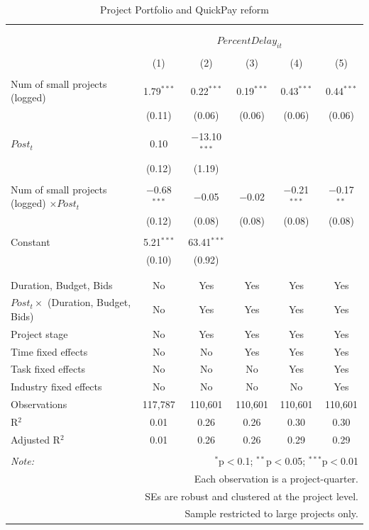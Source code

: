 \documentclass[
]{article}
\begin{document}
\begin{table}[H] \centering 
  \caption{Project Portfolio and QuickPay reform} 
  \label{} 
\small 
\begin{tabular}{@{\extracolsep{-10pt}}lccccc} 
\\[-1.8ex]\hline 
\hline \\[-1.8ex] 
\\[-1.8ex] & \multicolumn{5}{c}{$PercentDelay_{it}$} \\ 
\\[-1.8ex] & (1) & (2) & (3) & (4) & (5)\\ 
\hline \\[-1.8ex] 
 Num of small projects (logged) & 1.79$^{***}$ & 0.22$^{***}$ & 0.19$^{***}$ & 0.43$^{***}$ & 0.44$^{***}$ \\ 
  & (0.11) & (0.06) & (0.06) & (0.06) & (0.06) \\ 
  & & & & & \\ 
 $Post_t$ & 0.10 & $-$13.10$^{***}$ &  &  &  \\ 
  & (0.12) & (1.19) &  &  &  \\ 
  & & & & & \\ 
 Num of small projects (logged) $\times Post_t$ & $-$0.68$^{***}$ & $-$0.05 & $-$0.02 & $-$0.21$^{***}$ & $-$0.17$^{**}$ \\ 
  & (0.12) & (0.08) & (0.08) & (0.08) & (0.08) \\ 
  & & & & & \\ 
 Constant & 5.21$^{***}$ & 63.41$^{***}$ &  &  &  \\ 
  & (0.10) & (0.92) &  &  &  \\ 
  & & & & & \\ 
\hline \\[-1.8ex] 
Duration, Budget, Bids & No & Yes & Yes & Yes & Yes \\ 
$Post_t \times $  (Duration, Budget, Bids) & No & Yes & Yes & Yes & Yes \\ 
Project stage & No & Yes & Yes & Yes & Yes \\ 
Time fixed effects & No & No & Yes & Yes & Yes \\ 
Task fixed effects & No & No & No & Yes & Yes \\ 
Industry fixed effects & No & No & No & No & Yes \\ 
Observations & 117,787 & 110,601 & 110,601 & 110,601 & 110,601 \\ 
R$^{2}$ & 0.01 & 0.26 & 0.26 & 0.30 & 0.30 \\ 
Adjusted R$^{2}$ & 0.01 & 0.26 & 0.26 & 0.29 & 0.29 \\ 
\hline 
\hline \\[-1.8ex] 
\textit{Note:}  & \multicolumn{5}{r}{$^{*}$p$<$0.1; $^{**}$p$<$0.05; $^{***}$p$<$0.01} \\ 
 & \multicolumn{5}{r}{Each observation is a project-quarter.} \\ 
 & \multicolumn{5}{r}{SEs are robust and clustered at the project level.} \\ 
 & \multicolumn{5}{r}{Sample restricted to large projects only.} \\ 
\end{tabular} 
\end{table}
\end{document}
